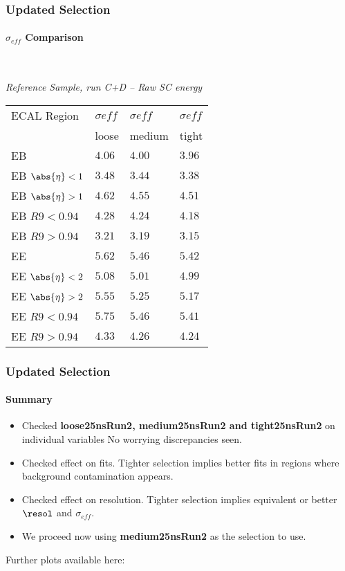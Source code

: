 \documentclass[8pt,serif]{beamer}
\begin{document}
\begin{frame}
\frametitle{Updated Selection}
 \framesubtitle{$ \sigma_{eff} $ Comparison}
\\
  
  \begin{center}
    \emph{Reference Sample, run C+D -- Raw SC energy}
\vspace{15mm}

\tiny \begin{tabular}{|l|p{30pt}|p{18pt}|p{18pt}|} \hline  
ECAL Region &  $\sigma {eff}$ &  $\sigma {eff}$ &  $\sigma {eff}$ \\ 
 &  loose &  medium &  tight \\ 
\hline     
EB & $4.06$ & $4.00$ & $3.96$ \\
EB $\abs{\eta} < 1$ & $3.48$ & $3.44$ & $3.38$ \\
EB $\abs{\eta} > 1$ & $4.62$ & $4.55$ & $4.51$ \\
EB $R9 < 0.94$ & $4.28$ & $4.24$ & $4.18$ \\
EB $R9 > 0.94$ & $3.21$ & $3.19$ & $3.15$ \\
\hline     
\hline     
EE & $5.62$ & $5.46$ & $5.42$ \\
EE $\abs{\eta} < 2$ & $5.08$ & $5.01$ & $4.99$ \\
EE $\abs{\eta} > 2$ & $5.55$ & $5.25$ & $5.17$ \\
EE $R9 < 0.94$ & $5.75$ & $5.46$ & $5.41$ \\
EE $R9 > 0.94$ & $4.33$ & $4.26$ & $4.24$ \\
\hline  
\end{tabular} 
  \end{center}


\end{frame}
\begin{frame}
\frametitle{Updated Selection}
\framesubtitle{Summary}

\vspace{10mm}

\begin{itemize}
\item Checked \textbf{loose25nsRun2, medium25nsRun2 and tight25nsRun2} on individual variables
\subitem No worrying discrepancies seen.
\item Checked effect on fits. 
\subitem Tighter selection implies better fits in regions where background contamination appears.
\item Checked effect on resolution. 
\subitem Tighter selection implies equivalent or better $\resol$ and $\sigma_{eff}$.
\item We proceed now using \textbf{medium25nsRun2} as the selection to use.
\end{itemize}
  
Further plots available here:	\href{https://lcorpe.web.cern.ch/lcorpe/MoCa/data-data/moca-talk-131115/data-data-data-selection-plots/}{}
\end{frame}
\end{document}
